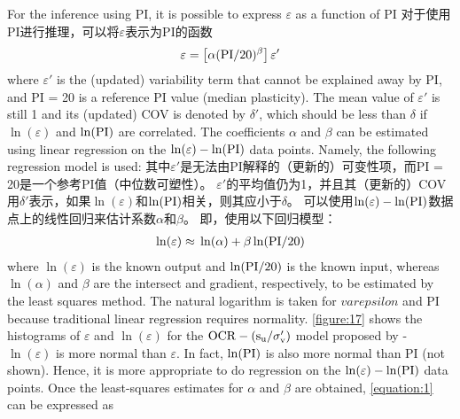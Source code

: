 
\begin{Parallel}{0.60\textwidth}{}
    \ParallelLText
    {
        For the inference using PI, it is possible to express $\varepsilon$ as a function of PI
    }
    \ParallelRText
    {
        对于使用PI进行推理，可以将$\varepsilon$表示为PI的函数
    }
    \ParallelPar
    \begin{align}
        \varepsilon=\left[\alpha(\rm{PI}/20)^\beta\right]\varepsilon'
        \label{equation:4}
    \end{align}
    \ParallelLText
    {
        where $\varepsilon'$ is the (updated) variability term that cannot be explained away by PI, and PI = 20 is a reference PI value (median plasticity). The mean value of $\varepsilon'$ is still 1 and its (updated) COV is denoted by $\delta'$, which should be less than $\delta$ if $\ln(\varepsilon)$ and $\ln(\rm{PI})$ are correlated. The coefficients $\alpha$ and $\beta$ can be estimated using linear regression on the $\ln(\varepsilon)-\ln(\rm{PI})$ data points. Namely, the following regression model is used:
    }
    \ParallelRText
    {
        其中$\varepsilon'$是无法由PI解释的（更新的）可变性项，而PI = 20是一个参考PI值（中位数可塑性）。 $\varepsilon'$的平均值仍为1，并且其（更新的）COV用$\delta'$表示，如果$\ln(\varepsilon)$和$\ln(\rm{PI})$相关，则其应小于$\delta$。 可以使用$\ln(\varepsilon)-\ln(\rm{PI})$数据点上的线性回归来估计系数$\alpha$和$\beta$。 即，使用以下回归模型：
    }
    \ParallelPar
    \begin{align}
        \ln(\varepsilon)\approx{}\ln(\alpha)+\beta\ln(\rm{PI}/20)
        \label{equation:5}
    \end{align}
    \ParallelLText
    {
        where $\ln(\varepsilon)$ is the known output and $\ln(\rm{PI}/20)$ is the known input, whereas $\ln(\alpha)$ and $\beta$ are the intersect and gradient, respectively, to be estimated by the least squares method. The natural logarithm is taken for $varepsilon$ and PI because traditional linear regression requires normality. \autoref{figure:17} shows the histograms of $\varepsilon$ and $\ln(\varepsilon)$ for the $\rm{OCR}-(s_u/\sigma_v')$ model proposed by \citet{Jamiolkowski198557} - $\ln(\varepsilon)$ is more normal than $\varepsilon$. In fact, $\ln(\rm{PI})$ is also more normal than PI (not shown). Hence, it is more appropriate to do regression on the $\ln(\varepsilon)-\ln(\rm{PI})$ data points. Once the least-squares estimates for $\alpha$ and $\beta$ are obtained, \autoref{equation:1} can be expressed as
}
\end{Parallel}
